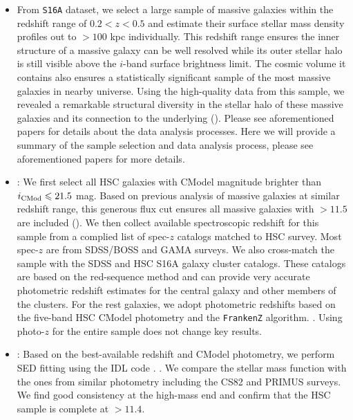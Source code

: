 \documentclass[a4paper,fleqn,usenatbib]{mnras}
\begin{document}
	\begin{itemize}
	
		\item From \texttt{S16A} dataset, we select a large sample of massive galaxies
			within the redshift range of $0.2 < z < 0.5$ and estimate their surface 
			stellar mass density profiles out to $>100$ kpc individually.
			This redshift range ensures the inner structure of a massive galaxy can be 
			well resolved while its outer stellar halo is still visible above the $i$-band
			surface brightness limit. 
			The cosmic volume it contains also ensures a statistically significant sample 
			of the most massive galaxies in nearby universe.
			Using the high-quality data from this sample, we revealed a remarkable structural
			diversity in the stellar halo of these massive galaxies and its connection to 
			the underlying \mhalo{} (\addref{}).
			Please see aforementioned papers for details about the data analysis processes.
			Here we will provide a summary of the sample selection and data analysis 
			process, please see aforementioned papers for more details.
			
		\item {}: We first select all HSC galaxies with CModel magnitude 
			brighter than $i_{\rm CMod} \leq 21.5$ mag. Based on previous analysis of massive 
			galaxies at similar redshift range, this generous flux cut ensures all massive
			galaxies with \mstar{}$>11.5$ are included (\addref{}).
			We then collect available spectroscopic redshift for this sample from a complied 
			list of spec-$z$ catalogs matched to HSC survey. 
			Most spec-$z$ are from SDSS/BOSS and GAMA surveys.
			We also cross-match the sample with the SDSS \redm{} and HSC S16A \camira{} 
			galaxy cluster catalogs. 
			These catalogs are based on the red-sequence method and can provide very accurate
			photometric redshift estimates for the central galaxy and other members of the
			clusters.
			For the rest galaxies, we adopt photometric redshifts based on the five-band
			HSC CModel photometry and the \texttt{FrankenZ} algorithm. . Using photo-$z$ for the entire sample 
			does not change key results.
		
		\item {}: Based on the best-available redshift and CModel photometry, 
			we perform SED fitting using the IDL code \ised{}. 
			.
			We compare the \mcmodel{} stellar mass function with the ones from similar 
			photometry including the CS82 and PRIMUS surveys. 
			We find good consistency at the high-mass end and confirm that the HSC 
			sample is complete at \mcmodel{}$>11.4$.
					
	\end{itemize}
\end{document}
